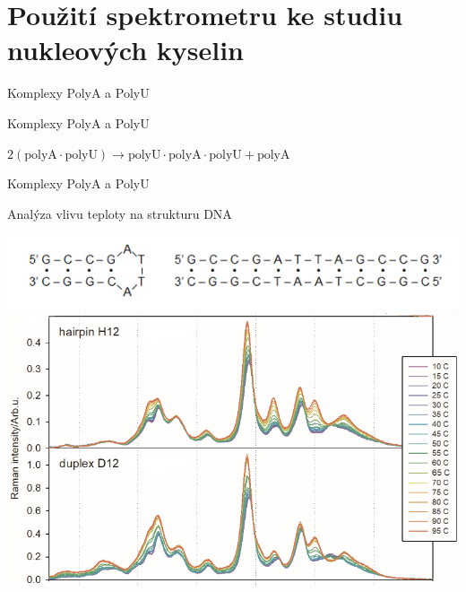 \documentclass{beamer}
\begin{document}
\section{Použití spektrometru ke studiu nukleových kyselin}

\begin{frame}{Komplexy PolyA a PolyU}
\begin{center}
	\resizebox{1\columnwidth}{!}{}
\end{center}
\end{frame}

\begin{frame}{Komplexy PolyA a PolyU}
\begin{center}
	$2 (\text{polyA} \cdot \text{polyU}) \rightarrow
		\text{polyU} \cdot \text{polyA} \cdot \text{polyU} + \text{polyA}$
\end{center}
\begin{center}
	\resizebox{1\columnwidth}{!}{}
\end{center}
\end{frame}

\begin{frame}{Komplexy PolyA a PolyU}
\begin{center}
	\resizebox{1\columnwidth}{!}{}
\end{center}
\end{frame}

\begin{frame}{Analýza vlivu teploty na strukturu DNA}
\begin{center}
	\includegraphics[width=1\columnwidth]{dna_hairpins/structure}
	\includegraphics[width=.9\columnwidth]{dna_hairpins/melting_spectra}
\end{center}
\end{frame}
\end{document}
